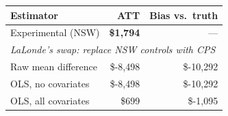 \begin{tabular}{lrr}
\toprule
\textbf{Estimator} & \textbf{ATT} & \textbf{Bias vs.\ truth} \\
\midrule
Experimental (NSW)         & \textcolor{rmgold}{\textbf{\$1,794}} & --- \\
\midrule
\multicolumn{3}{l}{\textit{LaLonde's swap: replace NSW controls with CPS}} \\
Raw mean difference        & \$-8,498 & \$-10,292 \\
OLS, no covariates         & \$-8,498 & \$-10,292 \\
OLS, all covariates        & \$699 & \$-1,095 \\
\bottomrule
\end{tabular}
